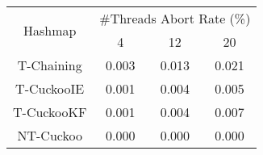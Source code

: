 \begin{tabular}{|c|c|c|c|}
\hline
\multirow{2}{*}{Hashmap} & \multicolumn{3}{c|}{\#Threads Abort Rate (\%)}\\\cline{2-4}& 4 & 12 & 20\\
\hline
\hline
T-Chaining & 0.003 & 0.013 & 0.021\\
T-CuckooIE & 0.001 & 0.004 & 0.005\\
T-CuckooKF & 0.001 & 0.004 & 0.007\\
NT-Cuckoo & 0.000 & 0.000 & 0.000\\
\hline
\end{tabular}
